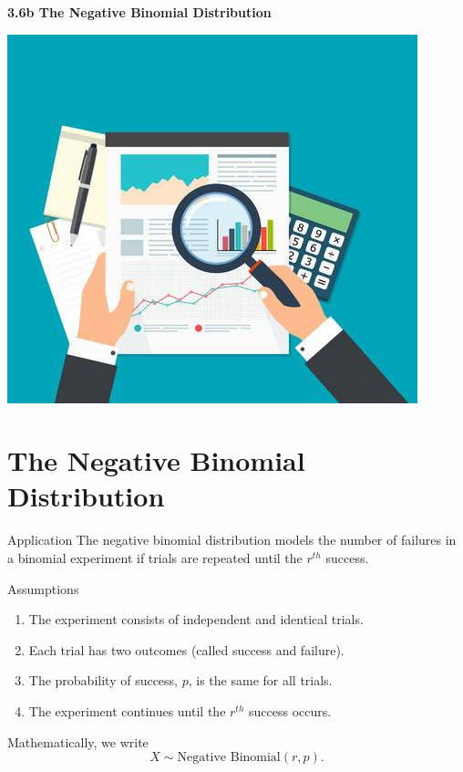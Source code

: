 \begin{frame}
  \frametitle{}

  \begin{center}
    \Large{\textbf{3.6b The Negative Binomial Distribution}}
  \end{center}

  \begin{center}
    \includegraphics[height=.5\textheight]{figure/audit}
  \end{center}


\end{frame}

\section{The Negative Binomial Distribution}

\begin{frame}
  \begin{block}{Application}
    The negative binomial distribution models the number of failures in a binomial experiment if trials are repeated until the $r^{th}$ success.
  \end{block}

  \begin{block}{Assumptions}
    \begin{enumerate}
    \item The experiment consists of independent and identical trials.
    \item Each trial has two outcomes (called success and failure).
    \item The probability of success, $p$, is the same for all trials.
    \item The experiment continues until the $r^{th}$ success occurs.
    \end{enumerate}
  \end{block}

  \bigskip

  Mathematically, we write
  \[
    X \sim \mbox{Negative Binomial}(r,p).
  \]
\end{frame}

